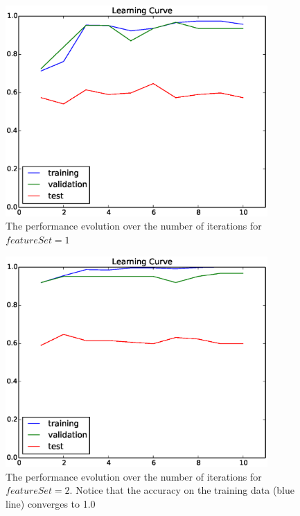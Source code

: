\begin{figure}[hbtp]
\centering
\includegraphics[width=100mm]{learning_curve_1}
\caption{The performance evolution over the number of iterations for $featureSet=1$}
\label{fig:learning_curve_1}
\end{figure}

\begin{figure}[hbtp]
\centering
\includegraphics[width=100mm]{learning_curve_2}
\caption{The performance evolution over the number of iterations for $featureSet=2$.  Notice that the accuracy on the training data (blue line) converges to 1.0}
\label{fig:learning_curve_2}
\end{figure}

